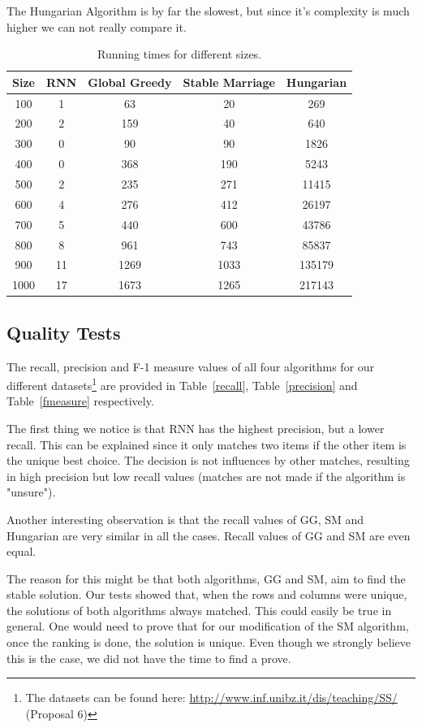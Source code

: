 \documentclass[a4paper,11pt]{article}
\begin{document}
The Hungarian Algorithm is by far the slowest, but since it's complexity is much higher we can not really compare it.

\begin{table}[tbh]
\centering
\begin{tabular}{|c|c|c|c|c|}
\hline 
Size & RNN & Global Greedy & Stable Marriage & Hungarian \tabularnewline
\hline 
\hline 
 100 & 1 & 63 & 20 & 269\tabularnewline
\hline
 200 & 2 & 159 & 40 & 640\tabularnewline
\hline 
 300 & 0 & 90 & 90 & 1826\tabularnewline
\hline 
 400 & 0 & 368 & 190 & 5243\tabularnewline
\hline 
 500 & 2 & 235 & 271 & 11415\tabularnewline
\hline 
 600 & 4 & 276 & 412 & 26197\tabularnewline
\hline 
 700 & 5 & 440 & 600 & 43786\tabularnewline
\hline
 800 & 8 & 961 & 743 & 85837\tabularnewline
\hline 
 900 & 11 & 1269 & 1033 & 135179\tabularnewline
\hline
 1000 & 17 & 1673 & 1265 & 217143\tabularnewline
\hline 
\end{tabular}
\caption{Running times for different sizes.}
\label{runtimes}
\end{table}

\subsection{Quality Tests}

The recall, precision and F-1 measure values of all four algorithms for our different datasets\footnote{The datasets can be found here: \url{http://www.inf.unibz.it/dis/teaching/SS/} (Proposal 6)} are provided in Table~\ref{recall}, Table~\ref{precision} and Table~\ref{fmeasure} respectively. 

The first thing we notice is that RNN has the highest precision, but a lower recall. This can be explained since it only matches two items if the other item is the unique best choice. The decision is not influences by other matches, resulting in high precision but low recall values (matches are not made if the algorithm is "unsure").

Another interesting observation is that the recall values of GG, SM and Hungarian are very similar in all the cases. Recall values of GG and SM are even equal. %

The reason for this might be that both algorithms, GG and SM, aim to find the stable solution. Our tests showed that, when the rows and columns were unique, the solutions of both algorithms always matched. This could easily be true in general. One would need to prove that for our modification of the SM algorithm, once the ranking is done, the solution is unique. Even though we strongly believe this is the case, we did not have the time to find a prove.
\end{document}
